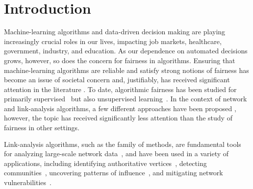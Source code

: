\documentclass[sigconf, anonymous, review]{acmart}
\begin{document}

\section{Introduction}
\label{section:intro}
Machine-learning algorithms and data-driven decision making are playing 
increasingly crucial roles in our lives, 
impacting job markets, healthcare, government, industry, and education. 
As our dependence on automated decisions grows, however, 
so does the concern for fairness in algorithms. 
Ensuring that machine-learning algorithms are reliable
and satisfy strong notions of fairness
has become an issue of societal concern and, 
justifiably, has received significant attention in the literature \citep{fu2022fair,kearns2017fair}.
To date, algorithmic fairness has been studied for primarily supervised~\citep{hardt2016equality,joseph2016fairness,pedreshi2008discrimination,zemel2013learning}
but also unsupervised learning~\citep{bera2019fair,chen2019proportionally,chierichetti2017fair}.
In the context of network and link-analysis algorithms, 
a few different approaches 
have been proposed \citep{khajehnejad_crosswalk_2022,rahman_fairwalk_2019,tsioutsiouliklis_fairness-aware_2021,tsioutsiouliklis_link_2022,zeng_fair_2021}, 
however, the topic has received significantly less attention
than the study of fairness in other settings. 

Link-analysis algorithms, such as the \pagerank family of methods, 
are fundamental tools for analyzing large-scale network data~\citep{gleich_pagerank_2015,bahmani2012pagerank}, 
and have been used in a variety of applications, including 
identifying authoritative vertices~\citep{wang2020personalized}, 
detecting communities~\citep{tabrizi2013personalized}, 
uncovering patterns of influence~\citep{liu2017influence}, and 
mitigating network vulnerabilities~\citep{kay2021identification}. 
\end{document}
